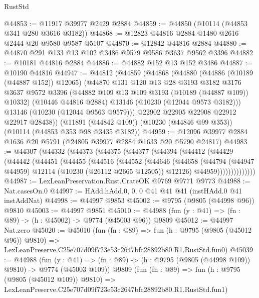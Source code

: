\begin{lexlean}{RustStd}
\begin{coremodule}
@44853 := @11917 @39977 @2429 @2884
@44859 := @44850 (@10114 (@44853 @341 @280 @3616 @3182))
@44868 := @12823 @44816 @2884 @1480 @2616 @2444 @20 @9580 @9587 @5107
@44870 := @12842 @44816 @2884
@44880 := @44870 @291 @133 @13 @102 @3486 @9579 @9586 @3637 @9562 @3396
@44882 := @10181 @44816 @2884
@44886 := @44882 @152 @13 @152 @3486
@44887 := @10190 @44816
@44947 := @44812
    (@44859
      (@44868
        (@44880
          (@44886 (@10189 (@44887 @152)) @12065)
          (@44870
            @131
            @120
            @13
            @28
            @3193
            @3182
            @3176
            @3637
            @9572
            @3396
            (@44882 @109 @13 @109 @3193 (@10189 (@44887 @109)) @10332)
            (@10446 @44816 @2884)
            @13146
            (@10230 (@12044 @9573 @3182)))
          @13146
          (@10230 (@12044 @9563 @9579)))
        @22902
        @22905
        @22908
        @22912
        @22917
        @28438))
    (@11891 (@44842 @109))
    (@10230 (@44846 @99 @353))
    (@10114 (@44853 @353 @98 @3435 @3182))
@44959 := @12096 @39977 @2884 @1636 @20 @5791 (@24805 @39977 @2884 @1633 @20 @5790 @24817)
@44983 := @44307
    (@44332
      (@44373
        (@44375
          (@44377
            (@44394
              (@44412
                (@44429
                  (@44442
                    (@44451
                      (@44455
                        (@44516
                          (@44552
                            (@44646
                              (@44658
                                (@44794
                                  (@44947 @44959)
                                  @12114
                                  (@10230 (@26112 @2665 @12505))
                                  @12126)
                                @44959))))))))))))))
@44987 := LexLeanPreservation.Rust.CrateOK @9769 @9771 @9773
@44988 := Nat.casesOn.{0}
@44997 := HAdd.hAdd.{0, 0, 0} @41 @41 @41 (instHAdd.{0} @41 instAddNat)
@44998 := @44997 @9853
@45002 := @9795 (@9805 (@44998 @96)) @9810
@45003 := @44997 @9851
@45010 := @44988 (fun (y : @41) => (fn : @89) -> (h : @45002) -> @9774 (@45003 @96)) @9809
@45012 := @44997 Nat.zero
@45020 := @45010
    (fun (fn : @89) =>
    fun (h : @9795 (@9805 (@45012 @96)) @9810) =>
    LexLeanPreserve.C25e707d09f723e53c2647bfc28892b80.R1.RustStd.fun0)
@45039 := @44988
    (fun (y : @41) => (fn : @89) -> (h : @9795 (@9805 (@44998 @109)) @9810) -> @9774 (@45003 @109))
    @9809
    (fun (fn : @89) =>
    fun (h : @9795 (@9805 (@45012 @109)) @9810) =>
    LexLeanPreserve.C25e707d09f723e53c2647bfc28892b80.R1.RustStd.fun1)

\end{coremodule}
\end{lexlean}
